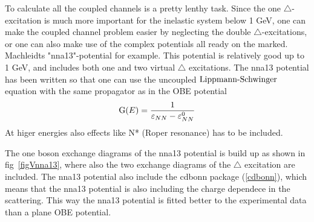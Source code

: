 To calculate all the coupled channels is a pretty lenthy task. Since the one $\triangle$-excitation
is much more important for the inelastic system below 1 GeV, one can make the coupled channel problem easier by
neglecting the double $\triangle$-excitations, or
one can also make use of the complex
potentials all ready on the marked. Machleidts "nna13"-potential for 
example. This potential is relatively good up to 1 GeV, and
includes both one and two virtual $\triangle$ excitations. 
The nna13 potential has been written so that one can use the uncoupled $\text{Lippmann-Schwinger}$ equation
with the same propagator as in the OBE potential
\begin{equation}
{{\text G(E)}}=\frac{1}{\varepsilon_{NN}-\varepsilon^0_{NN}}
\end{equation}
At higer energies also effects like N* (Roper resonance) has to be included.

The one boson exchange diagrams of the nna13 potential is build up as shown in fig~\ref{figVnna13},
where also the two exchange diagrams of the $\triangle$ excitation are included.
The nna13 potential also include the cdbonn package (\ref{cdbonn}), which means that the nna13 potential is also 
including the charge dependece in the scattering. This way
the nna13 potential is fitted better to the experimental data than a plane OBE potential. 

